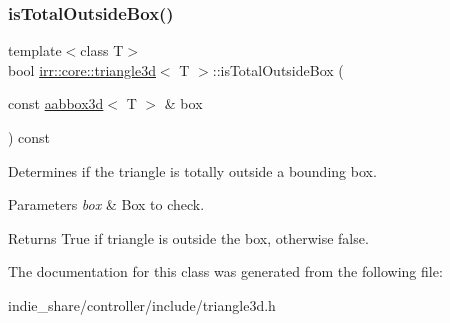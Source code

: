 \subsubsection{\texorpdfstring{is\+Total\+Outside\+Box()}{isTotalOutsideBox()}}
{\footnotesize\ttfamily template$<$class T$>$ \\
bool \hyperlink{classirr_1_1core_1_1triangle3d}{irr\+::core\+::triangle3d}$<$ T $>$\+::is\+Total\+Outside\+Box (\begin{DoxyParamCaption}\item[{const \hyperlink{classirr_1_1core_1_1aabbox3d}{aabbox3d}$<$ T $>$ \&}]{box }\end{DoxyParamCaption}) const\hspace{0.3cm}{\ttfamily [inline]}}



Determines if the triangle is totally outside a bounding box. 


\begin{DoxyParams}{Parameters}
{\em box} & Box to check. \\
\hline
\end{DoxyParams}
\begin{DoxyReturn}{Returns}
True if triangle is outside the box, otherwise false. 
\end{DoxyReturn}


The documentation for this class was generated from the following file\+:\begin{DoxyCompactItemize}
\item 
indie\+\_\+share/controller/include/triangle3d.\+h\end{DoxyCompactItemize}
